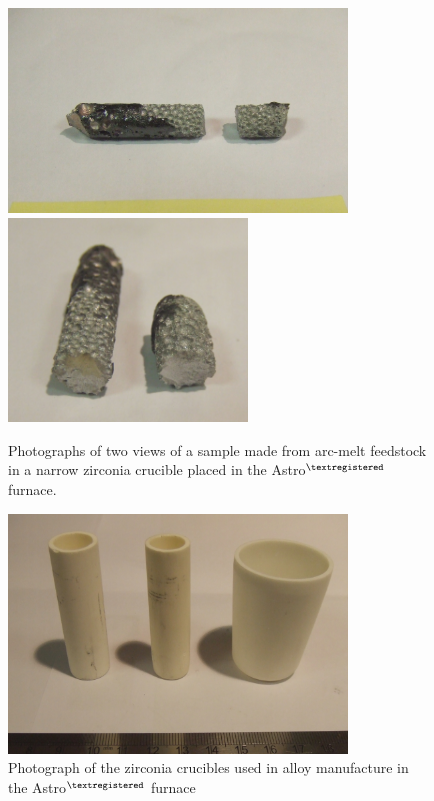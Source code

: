 %
\begin{figure}[H]
\begin{center}
\includegraphics[width=9cm]{spongei}
\includegraphics[width=6.36cm]{spongeii}
\caption{Photographs of two views of a sample made from arc-melt feedstock in a narrow zirconia crucible placed in the Astro$^{\textregistered}$ furnace.}
\label{fig:sponge}
\end{center}
\end{figure}
%
%
\begin{figure}[H]
\begin{center}
\includegraphics[width=9cm]{squat}
\caption{Photograph of the zirconia crucibles used in alloy manufacture in the Astro$^{\textregistered}$ furnace}
\label{fig:squat}
\end{center}
\end{figure}
%
